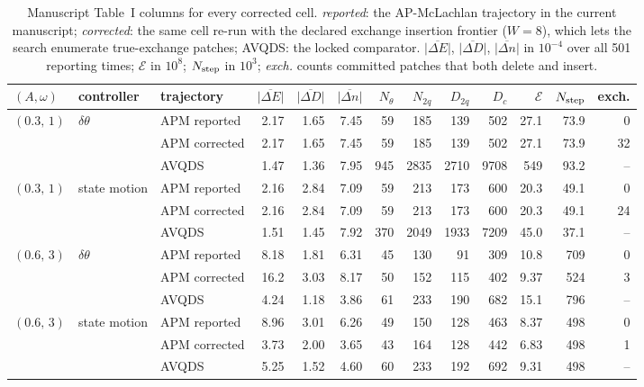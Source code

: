 \documentclass[10pt]{article}
\begin{document}
\begin{table}[H]\centering\scriptsize\setlength{\tabcolsep}{3pt}
\caption{Manuscript Table~I columns for every corrected cell.  \emph{reported}: the AP-McLachlan trajectory in the current manuscript; \emph{corrected}: the same cell re-run with the declared exchange insertion frontier ($W=8$), which lets the search enumerate true-exchange patches; AVQDS: the locked comparator.  $\overline{|\Delta E|}$, $\overline{|\Delta D|}$, $\overline{|\Delta n|}$ in $10^{-4}$ over all 501 reporting times; $\mathcal E$ in $10^{8}$; $N_{\rm step}$ in $10^{3}$; \emph{exch.} counts committed patches that both delete and insert.}
\begin{tabular}{lllrrrrrrrrrr}\toprule
$(A,\omega)$ & controller & trajectory & $\overline{|\Delta E|}$ & $\overline{|\Delta D|}$ & $\overline{|\Delta n|}$ & $N_\theta$ & $N_{2q}$ & $D_{2q}$ & $D_c$ & $\mathcal E$ & $N_{\rm step}$ & exch. \\ \midrule
$(0.3,\,1)$ & $\delta\theta$ & APM reported & 2.17 & 1.65 & 7.45 & 59 & 185 & 139 & 502 & 27.1 & 73.9 & 0 \\
 &  & APM corrected & 2.17 & 1.65 & 7.45 & 59 & 185 & 139 & 502 & 27.1 & 73.9 & 32 \\
 &  & AVQDS & 1.47 & 1.36 & 7.95 & 945 & 2835 & 2710 & 9708 & 549 & 93.2 & -- \\
\addlinespace[2pt]
$(0.3,\,1)$ & state motion & APM reported & 2.16 & 2.84 & 7.09 & 59 & 213 & 173 & 600 & 20.3 & 49.1 & 0 \\
 &  & APM corrected & 2.16 & 2.84 & 7.09 & 59 & 213 & 173 & 600 & 20.3 & 49.1 & 24 \\
 &  & AVQDS & 1.51 & 1.45 & 7.92 & 370 & 2049 & 1933 & 7209 & 45.0 & 37.1 & -- \\
\addlinespace[2pt]
$(0.6,\,3)$ & $\delta\theta$ & APM reported & 8.18 & 1.81 & 6.31 & 45 & 130 & 91 & 309 & 10.8 & 709 & 0 \\
 &  & APM corrected & 16.2 & 3.03 & 8.17 & 50 & 152 & 115 & 402 & 9.37 & 524 & 3 \\
 &  & AVQDS & 4.24 & 1.18 & 3.86 & 61 & 233 & 190 & 682 & 15.1 & 796 & -- \\
\addlinespace[2pt]
$(0.6,\,3)$ & state motion & APM reported & 8.96 & 3.01 & 6.26 & 49 & 150 & 128 & 463 & 8.37 & 498 & 0 \\
 &  & APM corrected & 3.73 & 2.00 & 3.65 & 43 & 164 & 128 & 442 & 6.83 & 498 & 1 \\
 &  & AVQDS & 5.25 & 1.52 & 4.60 & 60 & 233 & 192 & 692 & 9.31 & 498 & -- \\

\end{tabular}
\end{table}
\end{document}
